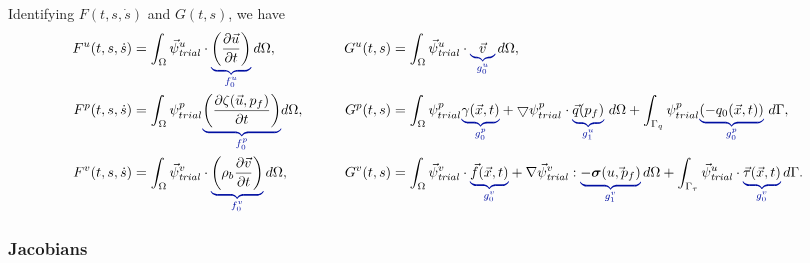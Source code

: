 Identifying $F(t,s,\dot{s})$ and $G(t,s)$, we have
\begin{alignat}{2}
  F^u(t,s,\dot{s}) &= \int_\Omega \trialvec[u] \cdot \eqnannotate{\left( 
\frac{\partial 
\vec{u}}{\partial t} 
\right)}{f_0^u} \, d\Omega,
  & \qquad
  G^u(t,s) &= \int_\Omega \trialvec[u] \cdot \eqnannotate{\vec{v}}{g_0^u} \, 
d\Omega, \\
  F^p(t,s,\dot{s}) &= \int_{\Omega} \psi_{trial}^p \eqnannotate{\left( 
\frac{\partial \zeta 
(\vec{u},p_f)}{\partial t} \right)}{f_0^p} d\Omega,
  & \qquad
  G^p(t,s) &= \int_{\Omega} \psi_{trial}^p 
\eqnannotate{\gamma(\vec{x},t)}{g_0^p} + \bigtriangledown \psi_{trial}^p \cdot 
\eqnannotate{\vec{q}(p_f)}{g_1^u} \ d\Omega + 
\int_{\Gamma_q} \psi_{trial}^p \eqnannotate{(-q_0(\vec{x},t))}{g_0^p} \ 
d\Gamma, \\
  F^v(t,s,\dot{s}) &= \int_\Omega \trialvec[v] \cdot \eqnannotate{\left( 
\rho_{b} \frac{\partial 
\vec{v}}{\partial t} 
\right)}{f_0^v} \, d\Omega,
  & \qquad
  G^v(t,s) &= \int_\Omega \trialvec[v] \cdot 
\eqnannotate{\vec{f}(\vec{x},t)}{g_0^v} + \nabla 
\trialvec[v] : 
\eqnannotate{-\tensor{\sigma}(\vec{u,p_{f}})}{g_1^v} \, d\Omega + 
\int_{\Gamma_\tau} \trialvec[u] 
\cdot 
\eqnannotate{\vec{\tau}(\vec{x},t)}{g_0^v} \, d\Gamma.
\end{alignat}


\subsubsection{Jacobians}

